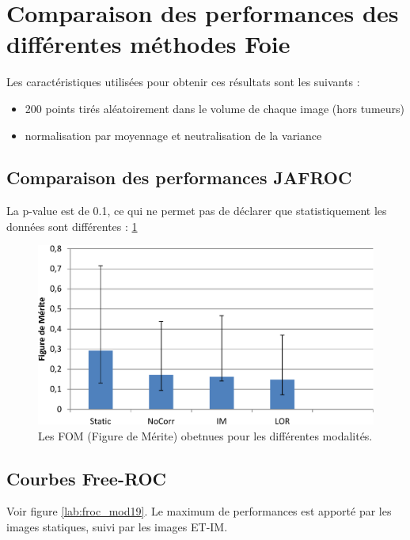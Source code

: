 \FloatBarrier

\section{Comparaison des performances des différentes méthodes Foie}

Les caractéristiques utilisées pour obtenir ces résultats sont les suivants :

\begin{itemize}
 \item 200 points tirés aléatoirement dans le volume de chaque image (hors tumeurs)
 \item normalisation par moyennage et neutralisation de la variance 
\end{itemize}

\subsection{Comparaison des performances JAFROC}

La p-value est de 0.1, ce qui ne permet pas de déclarer que statistiquement les données sont différentes : \ref{lab:fom_mod19}


\begin{figure}[h!]
 \begin{center}
   \includegraphics[width=15cm]{images/FOM_mod19}
 \end{center}
 \caption{ \label{lab:fom_mod19} Les FOM (Figure de Mérite) obetnues pour les différentes modalités.}
\end{figure}


\subsection{Courbes Free-ROC}

Voir figure \ref{lab:froc_mod19}.
Le maximum de performances est apporté par les images statiques, suivi par les images ET-IM.

